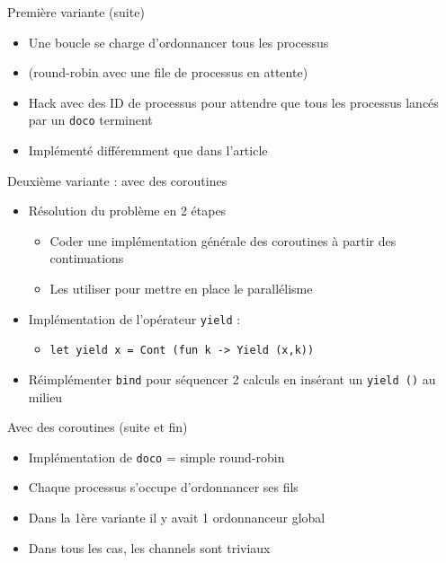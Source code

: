 \documentclass[xetex]{beamer}
\begin{document}
\begin{frame}{Première variante (suite)}
  \begin{itemize}
  \item Une boucle se charge d'ordonnancer tous les processus
  \item (round-robin avec une file de processus en attente)
  \item Hack avec des ID de processus pour attendre que tous les processus
    lancés par un \texttt{doco} terminent
  \item Implémenté différemment que dans l'article
  \end{itemize}
\end{frame}

\begin{frame}{Deuxième variante : avec des coroutines}
  \begin{itemize}
  \item Résolution du problème en 2 étapes
    \begin{itemize}
    \item Coder une implémentation générale des coroutines à partir
      des continuations
    \item Les utiliser pour mettre en place le parallélisme
    \end{itemize}
  \item Implémentation de l'opérateur \texttt{yield} :
    \begin{itemize}
    \item \texttt{let yield x = Cont (fun k -> Yield (x,k))}
    \end{itemize}
  \item Réimplémenter \texttt{bind} pour séquencer 2 calculs
    en insérant un \texttt{yield ()} au milieu
  \end{itemize}
\end{frame}

\begin{frame}{Avec des coroutines (suite et fin)}
  \begin{itemize}
  \item Implémentation de \texttt{doco} = simple round-robin
  \item Chaque processus s'occupe d'ordonnancer ses fils
  \item Dans la 1ère variante il y avait 1 ordonnanceur global
  \item Dans tous les cas, les channels sont triviaux
  \end{itemize}
\end{frame}
\end{document}
